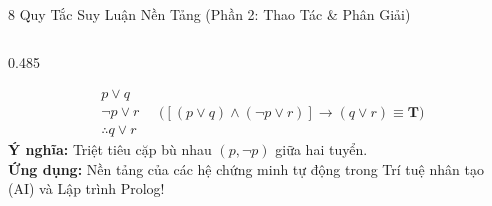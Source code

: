 \documentclass[aspectratio=169, 10pt]{beamer}
\begin{document}
\begin{frame}{8 Quy Tắc Suy Luận Nền Tảng (Phần 2: Thao Tác \& Phân Giải)}
\begin{columns}[t, onlytextwidth]
\begin{column}{0.485\textwidth}
      \vspace{0.08cm}
      \begin{cozyInsight}
        \scriptsize
        \vspace{-0.1cm}
        $$\begin{array}{l} p \lor q \\ \neg p \lor r \\ \hline \therefore q \lor r \end{array} \quad \Big( [(p \lor q) \land (\neg p \lor r)] \to (q \lor r) \equiv \mathbf{T} \Big)$$
        \textbf{Ý nghĩa:} Triệt tiêu cặp bù nhau $(p, \neg p)$ giữa hai tuyển.\\[3pt]
        \textbf{Ứng dụng:} Nền tảng của các hệ chứng minh tự động trong Trí tuệ nhân tạo (AI) và Lập trình Prolog!
      \end{cozyInsight}
    \end{column}
  \end{columns}
\end{frame}
\end{document}
